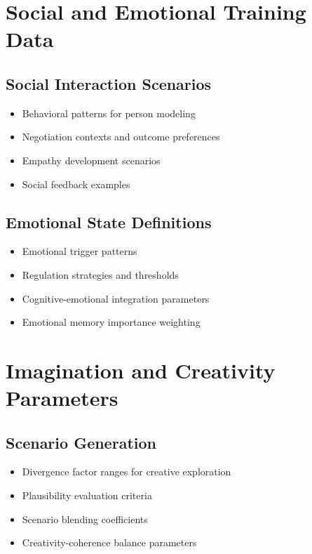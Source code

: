 \documentclass[11pt,a4paper]{article}
\begin{document}
\section{Social and Emotional Training Data}

\subsection{Social Interaction Scenarios}
\begin{itemize}[leftmargin=0.5in]
    \item Behavioral patterns for person modeling
    \item Negotiation contexts and outcome preferences
    \item Empathy development scenarios
    \item Social feedback examples
\end{itemize}

\subsection{Emotional State Definitions}
\begin{itemize}[leftmargin=0.5in]
    \item Emotional trigger patterns
    \item Regulation strategies and thresholds
    \item Cognitive-emotional integration parameters
    \item Emotional memory importance weighting
\end{itemize}

\section{Imagination and Creativity Parameters}

\subsection{Scenario Generation}
\begin{itemize}[leftmargin=0.5in]
    \item Divergence factor ranges for creative exploration
    \item Plausibility evaluation criteria
    \item Scenario blending coefficients
    \item Creativity-coherence balance parameters
\end{itemize}
\end{document}
